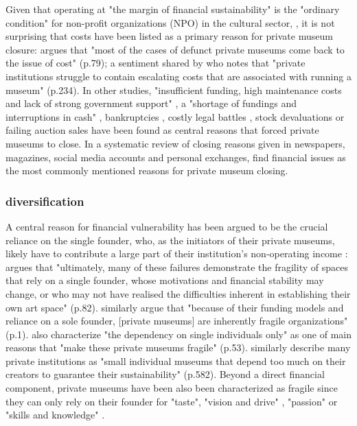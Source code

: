 \documentclass[12pt]{article}
\begin{document}
Given that operating at "the margin of financial sustainability" is the "ordinary condition" for non-profit organizations (NPO) in the cultural sector, \parencite[p.2]{Licci_BaraldiBonini_2024_sustainability}, it is not surprising that costs have been listed as a primary reason for private museum closure:
\textcite{Adam_2021_rise} argues that "most of the cases of defunct private museums come back to the issue of cost" (p.79); a sentiment shared by \textcite{Walker_2019_collector} who notes that "private institutions struggle to contain escalating costs that are associated with running a museum" (p.234).
In other studies, "insufficient funding, high maintenance costs and lack of strong government support" \parencite[p.7]{Zennaro_2017_shanghai}, a "shortage of fundings and interruptions in cash" \parencite[p.45]{Song_2008_private}, bankruptcies \parencite{Velthuis_Gera_2024_fragility,Liu_2019_identities,DeNigris_2018_museums}, costly legal battles \parencite{Velthuis_Gera_2024_fragility}, stock devaluations \parencite{Walker_2019_collector} or failing auction sales \parencite{Bechtler_Imhof_2018_future} have been found as central reasons that forced private museums to close.
In a systematic review of closing reasons given in newspapers, magazines, social media accounts and personal exchanges, \textcite{Velthuis_Gera_2024_fragility} find financial issues as the most commonly mentioned reasons for private museum closing.
\subsubsection*{diversification}




A central reason for financial vulnerability has been argued to be the crucial reliance on the single founder, who, as the initiators of their private museums, likely have to contribute a large part of their institution's non-operating income \parencite{Frey_Meier_2002_beyeler}:
\textcite{Adam_2021_rise} argues that "ultimately, many of these failures demonstrate the fragility of spaces that rely on a single founder, whose motivations and financial stability may change, or who may not have realised the difficulties inherent in establishing their own art space" (p.82).
\textcite{Velthuis_Gera_2024_fragility} similarly argue that "because of their funding models and reliance on a sole founder, [private museums] are inherently fragile organizations" (p.1).
\textcite{Bechtler_Imhof_2018_future} also characterize "the dependency on single individuals only" as one of main reasons that "make these private museums fragile" (p.53).
\textcite{StylianouLambert_etal_2014_museums} similarly describe many private institutions as "small individual museums that depend too much on their creators to guarantee their sustainability" (p.582).
Beyond a direct financial component, private museums have been also been characterized as fragile since they can only rely on their founder for "taste", "vision and drive" \parencite[p.77]{Adam_2021_rise}, "passion" \parencite[p.234]{Walker_2019_collector} or "skills and knowledge" \parencite[p.580]{StylianouLambert_etal_2014_museums}.
\end{document}
